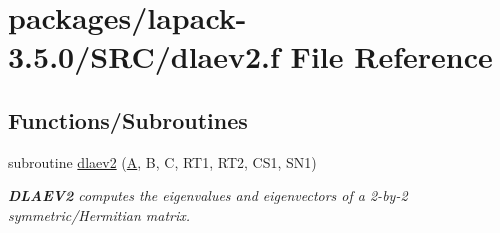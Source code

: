 \hypertarget{dlaev2_8f}{}\section{packages/lapack-\/3.5.0/\+S\+R\+C/dlaev2.f File Reference}
\label{dlaev2_8f}
\subsection*{Functions/\+Subroutines}
\begin{DoxyCompactItemize}
\item 
subroutine \hyperlink{group__auxOTHERauxiliary_ga404759a75990a78660c741b3448b27e8}{dlaev2} (\hyperlink{classA}{A}, B, C, R\+T1, R\+T2, C\+S1, S\+N1)
\begin{DoxyCompactList}\small\item\em {\bfseries D\+L\+A\+E\+V2} computes the eigenvalues and eigenvectors of a 2-\/by-\/2 symmetric/\+Hermitian matrix. \end{DoxyCompactList}\end{DoxyCompactItemize}
